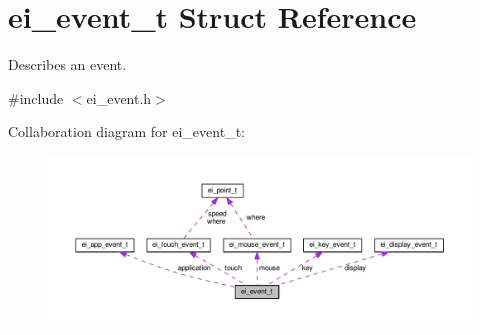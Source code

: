 \hypertarget{structei__event__t}{}\section{ei\+\_\+event\+\_\+t Struct Reference}
\label{structei__event__t}


Describes an event.  




{\ttfamily \#include $<$ei\+\_\+event.\+h$>$}



Collaboration diagram for ei\+\_\+event\+\_\+t\+:
\nopagebreak
\begin{figure}[H]
\begin{center}
\leavevmode
\includegraphics[width=350pt]{structei__event__t__coll__graph}
\end{center}
\end{figure}
